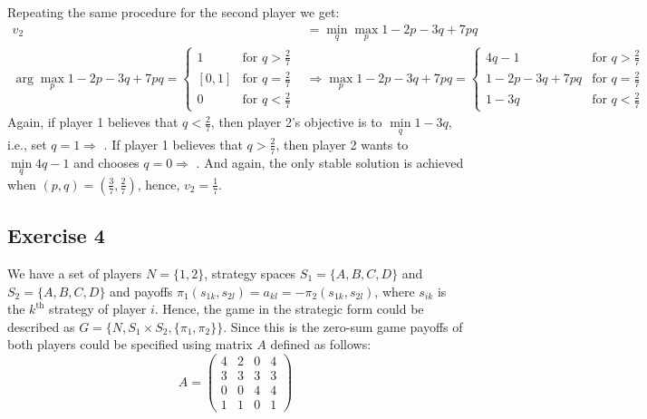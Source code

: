 \documentclass[]{article}
\begin{document}
\begin{enumerate}[label=(\roman*)]
	Repeating the same procedure for the second player we get:
	\begin{equation}
		\begin{split}
		v_2 &= \min\limits_{q}\max\limits_{p}1 - 2p - 3q + 7pq \\ \nonumber
		\arg\max\limits_{p}1 - 2p - 3q + 7pq = \begin{cases}
		1&\text{for }q > \frac{2}{7} \\
		[0, 1]&\text{for }q = \frac{2}{7} \\
		0&\text{for }q < \frac{2}{7}
		\end{cases} &\Rightarrow \max\limits_{p}1 - 2p - 3q + 7pq = \begin{cases}
		4q - 1&\text{for }q > \frac{2}{7} \\
		1 - 2p - 3q + 7pq&\text{for }q = \frac{2}{7} \\
		1 - 3q&\text{for }q < \frac{2}{7}
		\end{cases}
		\end{split}
	\end{equation}
	Again, if player 1 believes that $q < \frac{2}{7}$, then player 2's objective is to $\min\limits_{q}1 - 3q$, i.e., set $q = 1\Rightarrow$ \Lightning. If player 1 believes that $q > \frac{2}{7}$, then player 2 wants to $\min\limits_{q}4q - 1$ and chooses $q = 0\Rightarrow$ \Lightning. And again, the only stable solution is achieved when $(p, q) = (\frac{3}{7}, \frac{2}{7})$, hence, $v_2 = \frac{1}{7}$.
\end{enumerate}

\subsection*{Exercise 4}

We have a set of players $N = \{1, 2\}$, strategy spaces $S_1 = \{A, B, C, D\}$ and $S_2 = \{A, B, C, D\}$ and payoffs $\pi_1(s_{1k}, s_{2l}) = a_{kl} = -\pi_2(s_{1k}, s_{2l})$, where $s_{ik}$ is the $k^\text{th}$ strategy of player $i$. Hence, the game in the strategic form could be described as $G = \{N, S_1\times S_2, \{\pi_1, \pi_2\}\}$. Since this is the zero-sum game payoffs of both players could be specified using matrix $A$ defined as follows:
\begin{equation}
A = \begin{pmatrix}
4 & 2 & 0 & 4 \\
3 & 3 & 3 & 3 \\
0 & 0 & 4 & 4 \\
1 & 1 & 0 & 1
\end{pmatrix} \nonumber
\end{equation}
\end{document}
